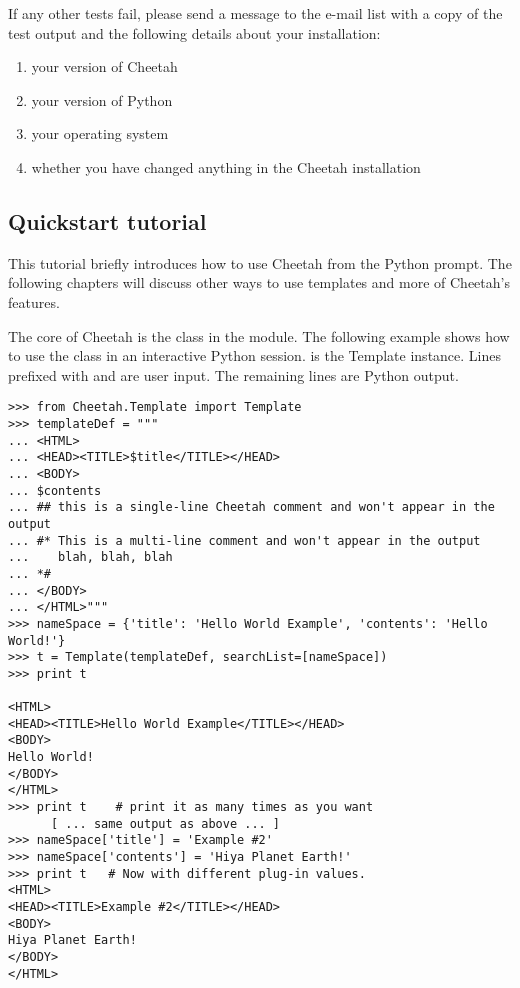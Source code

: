 If any other tests fail, please send a message to the e-mail list with a copy
of the test output and the following details about your installation:

\begin{enumerate}
\item your version of Cheetah
\item your version of Python
\item your operating system
\item whether you have changed anything in the Cheetah installation
\end{enumerate}


\subsection{Quickstart tutorial}
\label{gettingStarted.tutorial}

This tutorial briefly introduces how to use Cheetah from the Python prompt.
The following chapters will discuss other ways to use templates and more of
Cheetah's features.

The core of Cheetah is the  class in the 
module. The following example shows how to use the  class in an
interactive Python session.  is the Template instance.  Lines prefixed
with \code{>>>} and  are user input.  The remaining lines are Python
output.

\begin{verbatim}
>>> from Cheetah.Template import Template
>>> templateDef = """
... <HTML>
... <HEAD><TITLE>$title</TITLE></HEAD>
... <BODY>
... $contents
... ## this is a single-line Cheetah comment and won't appear in the output
... #* This is a multi-line comment and won't appear in the output
...    blah, blah, blah 
... *#
... </BODY>
... </HTML>"""
>>> nameSpace = {'title': 'Hello World Example', 'contents': 'Hello World!'}
>>> t = Template(templateDef, searchList=[nameSpace])
>>> print t
 
<HTML>
<HEAD><TITLE>Hello World Example</TITLE></HEAD>
<BODY>
Hello World!
</BODY>
</HTML>
>>> print t    # print it as many times as you want
      [ ... same output as above ... ]
>>> nameSpace['title'] = 'Example #2'
>>> nameSpace['contents'] = 'Hiya Planet Earth!'
>>> print t   # Now with different plug-in values.
<HTML>
<HEAD><TITLE>Example #2</TITLE></HEAD>
<BODY>
Hiya Planet Earth!
</BODY>
</HTML>

\end{verbatim}

